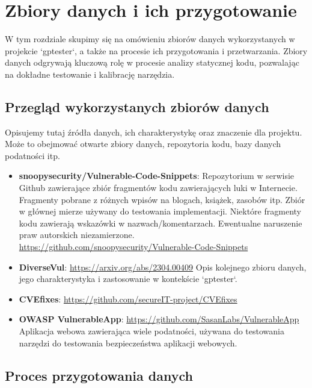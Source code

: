 \chapter{Zbiory danych i ich przygotowanie}
\label{ch:zbiory_danych}

W tym rozdziale skupimy się na omówieniu zbiorów danych wykorzystanych w projekcie `gptester`, a także na procesie ich przygotowania i przetwarzania. Zbiory danych odgrywają kluczową rolę w procesie analizy statycznej kodu, pozwalając na dokładne testowanie i kalibrację narzędzia.

\section{Przegląd wykorzystanych zbiorów danych}
\label{sec:przeglad_zbiorow}

Opisujemy tutaj źródła danych, ich charakterystykę oraz znaczenie dla projektu. Może to obejmować otwarte zbiory danych, repozytoria kodu, bazy danych podatności itp.

\begin{itemize}
    \item \textbf{snoopysecurity/Vulnerable-Code-Snippets}: Repozytorium w serwisie Github zawierające zbiór fragmentów kodu zawierających luki w Internecie. Fragmenty pobrane z różnych wpisów na blogach, książek, zasobów itp. 
    Zbiór w głównej mierze używany do testowania implementacji. Niektóre fragmenty kodu zawierają wskazówki w nazwach/komentarzach. Ewentualne naruszenie praw autorskich niezamierzone.\\ \url{https://github.com/snoopysecurity/Vulnerable-Code-Snippets}

    \item \textbf{DiverseVul}: \url{https://arxiv.org/abs/2304.00409} Opis kolejnego zbioru danych, jego charakterystyka i zastosowanie w kontekście `gptester`.
    \item \textbf{CVEfixes}: \url{https://github.com/secureIT-project/CVEfixes}
    \item \textbf{OWASP VulnerableApp}: \url{https://github.com/SasanLabs/VulnerableApp} Aplikacja webowa zawierająca wiele podatności, używana do testowania narzędzi do testowania bezpieczeństwa aplikacji webowych.
\end{itemize}

\section{Proces przygotowania danych}
\label{sec:proces_przygotowania_danych}

